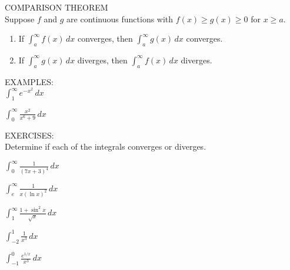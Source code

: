 \documentclass[11pt]{article}
\begin{document}
COMPARISON THEOREM\\


Suppose $f$ and $g$ are continuous functions with $f(x)\ge g(x)\ge 0$ for $x\ge a$.

\begin{enumerate}
\item{If $\int_a^{\infty}f(x)\, dx$ converges, then $\int_a^{\infty}g(x)\, dx$ converges.}
\item{If $\int_a^{\infty}g(x)\, dx$ diverges, then $\int_a^{\infty}f(x)\, dx$ diverges.}
  \end{enumerate}

\vspace{2in}


EXAMPLES:\\

$\int_1^{\infty} e^{-x^2} \, dx$


\vspace{2in}



$\int_0^{\infty} \frac{x^2}{x^6+9} \, dx$

\vspace{4in}


EXERCISES:\\

Determine if each of the integrals converges or diverges.\\

\vspace{0.15in}

$\int_0^{\infty}  \frac{1}{(7x+3)^4} \, dx$


\vspace{1.5in}

$\int_e^{\infty}  \frac{1}{x(\ln{x})^2} \, dx$

\vspace{1.5in}

$\int_1^{\infty}  \frac{1+\sin^2{x}}{\sqrt{x}} \, dx$

\vspace{1.5in}

$\int_{-2}^{1}  \frac{1}{x^3} \, dx$

\vspace{1.5in}

$\int_{-1}^{0}  \frac{e^{1/x}}{x^3} \, dx$
\end{document}
